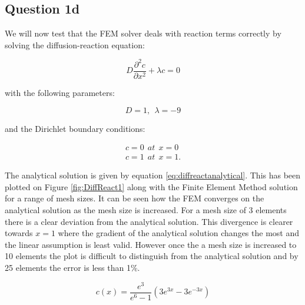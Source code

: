 \documentclass[11pt]{article}
\begin{document}
\subsection{Question 1d}

We will now test that the FEM solver deals with reaction terms correctly by solving the diffusion-reaction equation:

\begin{equation*}
D \frac{\partial^2 c}{\partial x^2} + \lambda c = 0
\end{equation*}

with the following parameters:

\begin{equation*}
D = 1, \ \  \lambda = -9
\end{equation*}

and the Dirichlet boundary conditions:


\begin{align*}
c = 0 \ \ at \ \ x = 0 \\
c = 1 \ \ at \ \  x= 1  .
\end{align*}


The analytical solution is given by equation \ref{eq:diffreactanalytical}. This has been plotted on Figure \ref{fig:DiffReact1} along with the Finite Element Method solution for a range of mesh sizes. It can be seen how the FEM converges on the analytical solution as the mesh size is increased. For a mesh size of 3 elements there is a clear deviation from the analytical solution. This divergence is clearer towards $x = 1$ where the gradient of the analytical solution changes the most and the linear assumption is least valid. However once the a mesh size is increased to 10 elements the plot is difficult to distinguish from the analytical solution and by 25 elements the error is less than 1\%.

\begin{equation}\label{eq:diffreactanalytical}
c(x) = \frac{e^3 }{e^6 - 1} (3e^{3x} - 3e^{-3x})
\end{equation}
\end{document}
